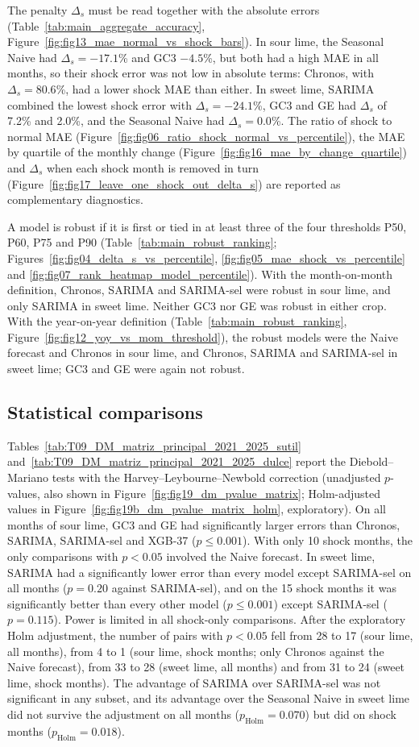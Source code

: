 \documentclass[forecasting,article,submit,moreauthors]{Definitions/mdpi}
\begin{document}
The penalty $\Delta_s$ must be read together with the absolute errors (Table~\ref{tab:main_aggregate_accuracy}, Figure~\ref{fig:fig13_mae_normal_vs_shock_bars}). In sour lime, the Seasonal Naive had $\Delta_s=-17.1$\% and GC3 $-4.5$\%, but both had a high MAE in all months, so their shock error was not low in absolute terms: Chronos, with $\Delta_s=80.6$\%, had a lower shock MAE than either. In sweet lime, SARIMA combined the lowest shock error with $\Delta_s=-24.1$\%, GC3 and GE had $\Delta_s$ of 7.2\% and 2.0\%, and the Seasonal Naive had $\Delta_s=0.0$\%. The ratio of shock to normal MAE (Figure~\ref{fig:fig06_ratio_shock_normal_vs_percentile}), the MAE by quartile of the monthly change (Figure~\ref{fig:fig16_mae_by_change_quartile}) and $\Delta_s$ when each shock month is removed in turn (Figure~\ref{fig:fig17_leave_one_shock_out_delta_s}) are reported as complementary diagnostics.

A model is robust if it is first or tied in at least three of the four thresholds P50, P60, P75 and P90 (Table~\ref{tab:main_robust_ranking}; Figures~\ref{fig:fig04_delta_s_vs_percentile}, \ref{fig:fig05_mae_shock_vs_percentile} and \ref{fig:fig07_rank_heatmap_model_percentile}). With the month-on-month definition, Chronos, SARIMA and SARIMA-sel were robust in sour lime, and only SARIMA in sweet lime. Neither GC3 nor GE was robust in either crop. With the year-on-year definition (Table~\ref{tab:main_robust_ranking}, Figure~\ref{fig:fig12_yoy_vs_mom_threshold}), the robust models were the Naive forecast and Chronos in sour lime, and Chronos, SARIMA and SARIMA-sel in sweet lime; GC3 and GE were again not robust.

\subsection{Statistical comparisons}
Tables~\ref{tab:T09_DM_matriz_principal_2021_2025_sutil} and~\ref{tab:T09_DM_matriz_principal_2021_2025_dulce} report the Diebold--Mariano tests with the Harvey--Leybourne--Newbold correction (unadjusted $p$-values, also shown in Figure~\ref{fig:fig19_dm_pvalue_matrix}; Holm-adjusted values in Figure~\ref{fig:fig19b_dm_pvalue_matrix_holm}, exploratory). On all months of sour lime, GC3 and GE had significantly larger errors than Chronos, SARIMA, SARIMA-sel and XGB-37 ($p\le0.001$). With only 10 shock months, the only comparisons with $p<0.05$ involved the Naive forecast. In sweet lime, SARIMA had a significantly lower error than every model except SARIMA-sel on all months ($p=0.20$ against SARIMA-sel), and on the 15 shock months it was significantly better than every other model ($p\le0.001$) except SARIMA-sel ($p=0.115$). Power is limited in all shock-only comparisons. After the exploratory Holm adjustment, the number of pairs with $p<0.05$ fell from 28 to 17 (sour lime, all months), from 4 to 1 (sour lime, shock months; only Chronos against the Naive forecast), from 33 to 28 (sweet lime, all months) and from 31 to 24 (sweet lime, shock months). The advantage of SARIMA over SARIMA-sel was not significant in any subset, and its advantage over the Seasonal Naive in sweet lime did not survive the adjustment on all months ($p_{\text{Holm}}=0.070$) but did on shock months ($p_{\text{Holm}}=0.018$).
\end{document}
